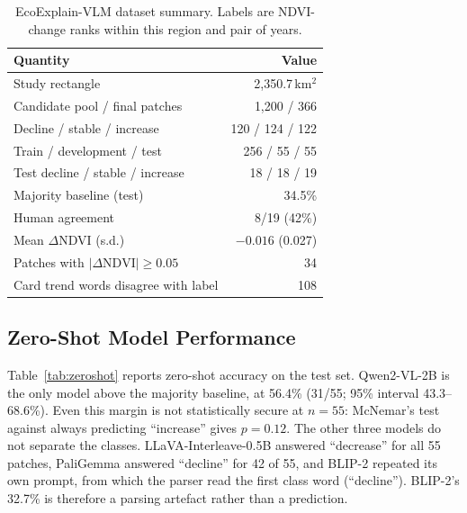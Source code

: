 \begin{table}[t]
\centering
\small
\begin{tabular}{lr}
\toprule
Quantity & Value \\
\midrule
Study rectangle & 2,350.7\,km$^2$ \\
Candidate pool / final patches & 1,200 / 366 \\
Decline / stable / increase & 120 / 124 / 122 \\
Train / development / test & 256 / 55 / 55 \\
Test decline / stable / increase & 18 / 18 / 19 \\
Majority baseline (test) & 34.5\% \\
Human agreement & 8/19 (42\%) \\
Mean $\Delta$NDVI (s.d.) & $-0.016$ (0.027) \\
Patches with $|\Delta\mathrm{NDVI}| \ge 0.05$ & 34 \\
Card trend words disagree with label & 108 \\
\bottomrule
\end{tabular}
\caption{EcoExplain-VLM dataset summary. Labels are NDVI-change ranks
within this region and pair of years.}
\label{tab:data}
\end{table}

\subsection{Zero-Shot Model Performance}

Table~\ref{tab:zeroshot} reports zero-shot accuracy on the test set.
Qwen2-VL-2B is the only model above the majority baseline, at 56.4\%
(31/55; 95\% interval 43.3--68.6\%). Even this margin is not
statistically secure at $n = 55$: McNemar's test against always
predicting ``increase'' gives $p = 0.12$. The other three models do not
separate the classes. LLaVA-Interleave-0.5B answered ``decrease'' for
all 55 patches, PaliGemma answered ``decline'' for 42 of 55, and BLIP-2
repeated its own prompt, from which the parser read the first class word
(``decline''). BLIP-2's 32.7\% is therefore a parsing artefact rather
than a prediction.

